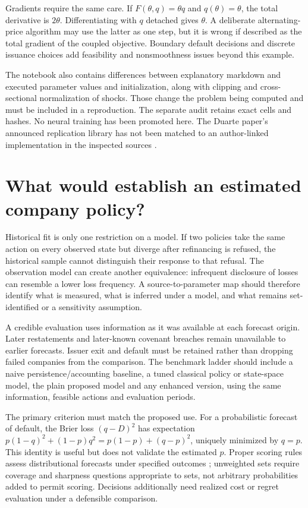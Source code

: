 \documentclass[11pt,a4paper]{article}
\begin{document}
Gradients require the same care. If $F(\theta,q)=\theta q$ and
$q(\theta)=\theta$, the total derivative is $2\theta$. Differentiating
with $q$ detached gives $\theta$. A deliberate alternating-price algorithm
may use the latter as one step, but it is wrong if described as the total
gradient of the coupled objective. Boundary default decisions and discrete
issuance choices add feasibility and nonsmoothness issues beyond this example.

The notebook also contains differences between explanatory markdown and
executed parameter values and initialization, along with clipping and
cross-sectional normalization of shocks. Those change the problem being
computed and must be included in a reproduction. The separate audit retains
exact cells and hashes. No neural training has been promoted here. The
Duarte paper's announced replication library has not been matched to an
author-linked implementation in the inspected sources \cite{duarte}.

\section{What would establish an estimated company policy?}
Historical fit is only one restriction on a model. If two policies take the
same action on every observed state but diverge after refinancing is refused,
the historical sample cannot distinguish their response to that refusal.
The observation model can create another equivalence: infrequent disclosure
of losses can resemble a lower loss frequency. A source-to-parameter map
should therefore identify what is measured, what is inferred under a model,
and what remains set-identified or a sensitivity assumption.

A credible evaluation uses information as it was available at each forecast
origin. Later restatements and later-known covenant breaches remain unavailable
to earlier forecasts. Issuer exit and default must be retained rather than
dropping failed companies from the comparison. The benchmark ladder should
include a naive persistence/accounting baseline, a tuned classical policy or
state-space model, the plain proposed model and any enhanced version, using
the same information, feasible actions and evaluation periods.

The primary criterion must match the proposed use. For a probabilistic
forecast of default, the Brier loss $(q-D)^2$ has expectation
$p(1-q)^2+(1-p)q^2=p(1-p)+(q-p)^2$, uniquely minimized by $q=p$. This
identity is useful but does not validate the estimated $p$. Proper scoring
rules assess distributional forecasts under specified outcomes
\cite{gneiting}; unweighted sets require coverage and sharpness questions
appropriate to sets, not arbitrary probabilities added to permit scoring.
Decisions additionally need realized cost or regret evaluation under a
defensible comparison.
\end{document}
